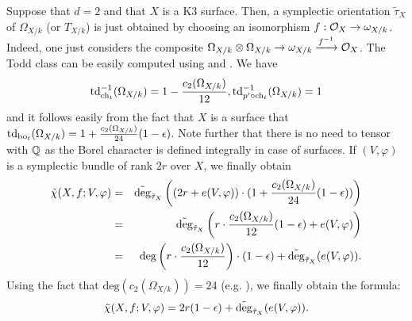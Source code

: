 \begin{ex}\label{ex:HRR-K3}
Suppose that $d=2$ and that $X$ is a K3 surface. Then, a symplectic orientation $\tilde\tau_X$ of $\Omega_{X/k}$ (or $T_{X/k}$) is just obtained by choosing an isomorphism $f:\mathcal O_X\to\omega_{X/k}$. Indeed, one just considers the composite $\Omega_{X/k}\otimes \Omega_{X/k}\to \omega_{X/k}\xrightarrow{f^{-1}} \mathcal O_X$. The Todd class can be easily computed using  and . We have
\[
\operatorname{td}_{\mathrm{ch}_t}^{-1}(\Omega_{X/k})=1-\frac{c_2(\Omega_{X/k})}{12}, \operatorname{td}_{p'\circ\mathrm{ch}_t}^{-1}(\Omega_{X/k})=1
\]
and it follows easily from the fact that $X$ is a surface that $\operatorname{td}_{\operatorname{bo}_t}(\Omega_{X/k})=1+\frac{c_2(\Omega_{X/k})}{24}(1-\epsilon)$. Note further that there is no need to tensor with $\mathbb{Q}$ as the Borel character is defined integrally in case of surfaces. If $(V,\varphi)$ is a symplectic bundle of rank $2r$ over $X$, we finally obtain
\begin{eqnarray*}
\tilde \chi(X,f;V,\varphi) &= &\tilde{\operatorname{deg}}_{\tilde \tau_X}\left((2r+e(V,\varphi))\cdot (1+\frac{c_2(\Omega_{X/k})}{24}(1-\epsilon))\right) \\
 & = & \tilde{\operatorname{deg}}_{\tilde \tau_X}\left(r\cdot \frac{c_2(\Omega_{X/k})}{12}(1-\epsilon)+e(V,\varphi)\right) \\
 & = & \mathrm{deg}\left(r\cdot \frac{c_2(\Omega_{X/k})}{12}\right)\cdot (1-\epsilon)+ \tilde{\operatorname{deg}}_{\tilde \tau_X}(e(V,\varphi)).
\end{eqnarray*}
Using the fact that $\mathrm{deg}(c_2(\Omega_{X/k}))=24$ (e.g. \cite{Huybrechts16}), we finally obtain the formula:
\[
\tilde \chi(X,f;V,\varphi)=2r(1-\epsilon)+\tilde{\operatorname{deg}}_{\tilde \tau_X}(e(V,\varphi)).
\]
\end{ex}
